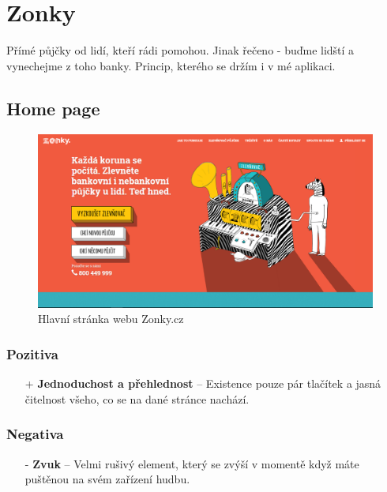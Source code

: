 \section{Zonky}
\label{analyza:zonky}

Přímé půjčky od lidí, kteří rádi pomohou. Jinak řečeno - buďme lidští a vynechejme z toho banky. Princip, kterého se držím i v mé aplikaci.

\subsection{Home page}
\begin{figure}[h]
    \centering
    \includegraphics[width=1.0\textwidth]{media/zonky/home.png}
    \caption{Hlavní stránka webu Zonky.cz}
    \label{fig:zonky:home}
\end{figure}
\subsubsection*{Pozitiva}
\begin{itemize}
    \item[+] \textbf{Jednoduchost a přehlednost} -- Existence pouze pár tlačítek a jasná čitelnost všeho, co se na dané stránce nachází.
\end{itemize}
\subsubsection*{Negativa}
\begin{itemize}
    \item[-] \textbf{Zvuk} -- Velmi rušivý element, který se zvýší v momentě když máte puštěnou na svém zařízení hudbu.
\end{itemize}



